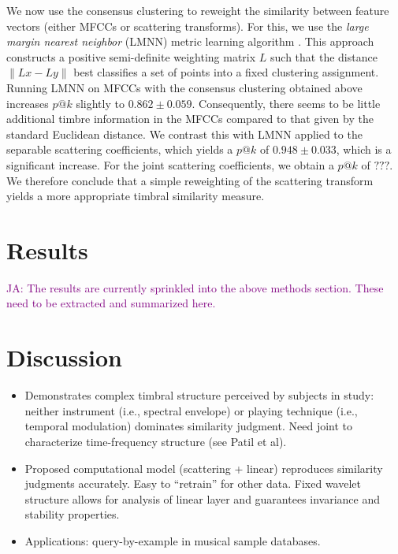 \documentclass{bmcart}
\makeatletter
\newcommand{\patk}{p\mathrm{@}k}
\newcommand{\ja}[1]{\textcolor{purple}{JA: #1}}
\makeatother
\begin{document}
We now use the consensus clustering to reweight the similarity between feature vectors (either MFCCs or scattering transforms).
For this, we use the \emph{large margin nearest neighbor} (LMNN) metric learning algorithm \cite{weinberger2006distance, weinberger2009distance}.
This approach constructs a positive semi-definite weighting matrix $L$ such that the distance $\|Lx - Ly\|$ best classifies a set of points into a fixed clustering assignment.
Running LMNN on MFCCs with the consensus clustering obtained above increases $\patk$ slightly to $0.862 \pm 0.059$.
Consequently, there seems to be little additional timbre information in the MFCCs compared to that given by the standard Euclidean distance.
We contrast this with LMNN applied to the separable scattering coefficients, which yields a $\patk$ of $0.948 \pm 0.033$, which is a significant increase.
For the joint scattering coefficients, we obtain a $\patk$ of $???$.
We therefore conclude that a simple reweighting of the scattering transform yields a more appropriate timbral similarity measure.

\section*{Results}
\label{sec:results}

\ja{The results are currently sprinkled into the above methods section.
These need to be extracted and summarized here.}

\section*{Discussion}
\label{sec:discussion}

\begin{itemize}
\item Demonstrates complex timbral structure perceived by subjects in study: neither instrument (i.e., spectral envelope) or playing technique (i.e., temporal modulation) dominates similarity judgment. Need joint to characterize time-frequency structure (see Patil et al).
\item Proposed computational model (scattering + linear) reproduces similarity judgments accurately. Easy to ``retrain'' for other data. Fixed wavelet structure allows for analysis of linear layer and guarantees invariance and stability properties.
\item Applications: query-by-example in musical sample databases.
\end{itemize}
\end{document}
